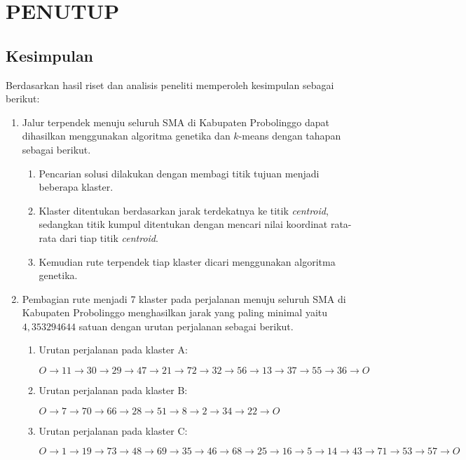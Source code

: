 \chapter{PENUTUP}

\section{Kesimpulan}

Berdasarkan hasil riset dan analisis peneliti memperoleh kesimpulan sebagai berikut:

\begin{enumerate}
\item Jalur terpendek menuju seluruh SMA di Kabupaten Probolinggo dapat dihasilkan menggunakan algoritma genetika dan $k$-means dengan tahapan sebagai berikut.
\begin{enumerate}
\item Pencarian solusi dilakukan dengan membagi titik tujuan menjadi beberapa klaster.
\item Klaster ditentukan berdasarkan jarak terdekatnya ke titik \textit{centroid}, sedangkan titik kumpul ditentukan dengan mencari nilai koordinat rata-rata dari tiap titik \textit{centroid}.
\item Kemudian rute terpendek tiap klaster dicari menggunakan algoritma genetika.
\end{enumerate}

\item Pembagian rute menjadi 7 klaster pada perjalanan menuju seluruh SMA di Kabupaten Probolinggo menghasilkan jarak yang paling minimal yaitu $4,353294644$ satuan dengan urutan perjalanan sebagai berikut.

\begin{enumerate}

\item Urutan perjalanan pada klaster A:

$O \to 11 \to 30 \to 29 \to 47 \to 21 \to 72 \to 32 \to 56 \to 13 \to 37 \to 55 \to 36 \to O$

\item Urutan perjalanan pada klaster B:

$O \to 7 \to 70 \to 66 \to 28 \to 51 \to 8 \to 2 \to 34 \to 22 \to O$

\item Urutan perjalanan pada klaster C:

$O \to 1 \to 19 \to 73 \to 48 \to 69 \to 35 \to 46 \to 68 \to 25 \to 16 \to 5 \to 14 \to 43 \to 71 \to 53 \to 57 \to O$


\end{enumerate}
\end{enumerate}
